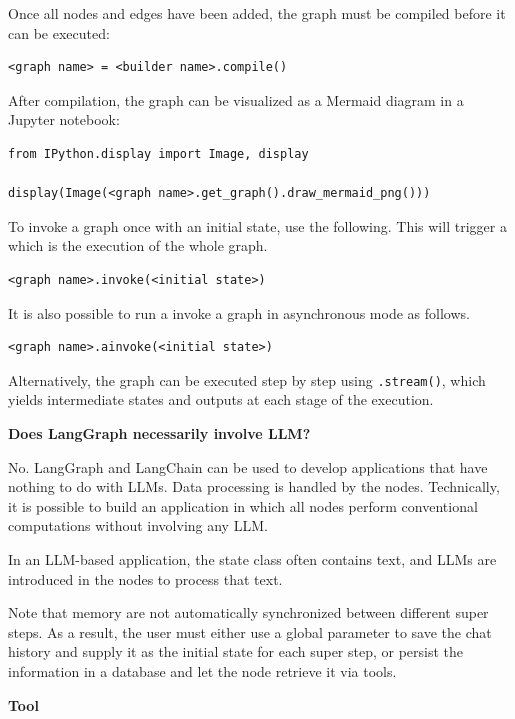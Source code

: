 Once all nodes and edges have been added, the graph must be compiled before it can be executed:
\begin{lstlisting}
<graph name> = <builder name>.compile()
\end{lstlisting}

After compilation, the graph can be visualized as a Mermaid diagram in a Jupyter notebook:
\begin{lstlisting}
from IPython.display import Image, display

display(Image(<graph name>.get_graph().draw_mermaid_png()))
\end{lstlisting}

To invoke a graph once with an initial state, use the following. This will trigger a  which is the execution of the whole graph.
\begin{lstlisting}
<graph name>.invoke(<initial state>)
\end{lstlisting}
It is also possible to run a invoke a graph in asynchronous mode as follows.
\begin{lstlisting}
<graph name>.ainvoke(<initial state>)
\end{lstlisting}
Alternatively, the graph can be executed step by step using \verb|.stream()|, which yields intermediate states and outputs at each stage of the execution.

\begin{mdframed}
\textbf{Does LangGraph necessarily involve LLM?}

No. LangGraph and LangChain can be used to develop applications that have nothing to do with LLMs. Data processing is handled by the nodes. Technically, it is possible to build an application in which all nodes perform conventional computations without involving any LLM.

In an LLM-based application, the state class often contains text, and LLMs are introduced in the nodes to process that text.
\end{mdframed}

Note that memory are not automatically synchronized between different super steps. As a result, the user must either use a global parameter to save the chat history and supply it as the initial state for each super step, or persist the information in a database and let the node retrieve it via tools.

\vspace{0.1in}
\noindent \textbf{Tool}
\vspace{0.1in}

